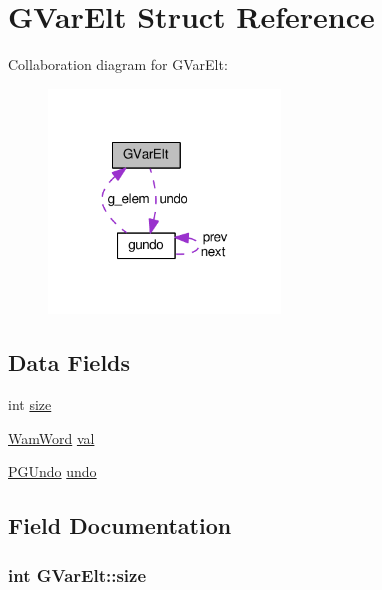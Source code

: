 \hypertarget{structGVarElt}{}\section{G\+Var\+Elt Struct Reference}
\label{structGVarElt}


Collaboration diagram for G\+Var\+Elt\+:\nopagebreak
\begin{figure}[H]
\begin{center}
\leavevmode
\includegraphics[width=175pt]{structGVarElt__coll__graph}
\end{center}
\end{figure}
\subsection*{Data Fields}
\begin{DoxyCompactItemize}
\item 
int \hyperlink{structGVarElt_a34b84647c8816d970311d1a2b3b2fd76}{size}
\item 
\hyperlink{LINUX__SIGSEGV_8c_a10ea8be8823feb38875b8a9326cbb424}{Wam\+Word} \hyperlink{structGVarElt_a504e22949f6283a81b42cd76a0016c63}{val}
\item 
\hyperlink{g__var__inl__c_8c_acdaf5dcad7c3513abf1cb0d0615bde91}{P\+G\+Undo} \hyperlink{structGVarElt_a2c5c97b5670810ddda1590885bdede42}{undo}
\end{DoxyCompactItemize}


\subsection{Field Documentation}
\subsubsection[{\texorpdfstring{size}{size}}]{\setlength{\rightskip}{0pt plus 5cm}int G\+Var\+Elt\+::size}\hypertarget{structGVarElt_a34b84647c8816d970311d1a2b3b2fd76}{}\label{structGVarElt_a34b84647c8816d970311d1a2b3b2fd76}
